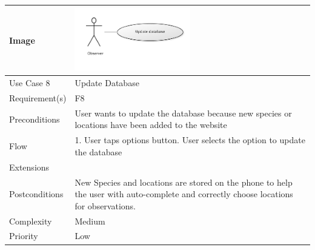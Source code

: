 \hspace{2em}


\begin{tabular}[t]{|l|p{}|}\hline
	Image&\includegraphics[width=0.5\textwidth]{reqspec/uc/updatedb.png} \\\hline
	Use Case 8&Update Database\\\hline
	Requirement(s)&F8\\\hline
	Preconditions&User wants to update the database because new species or
	locations have been added to the website\\\hline
	Flow&1. User taps options button\newline
	2. User selects the option to update the database\\\hline
	Extensions& \\\hline
	Postconditions&New Species and locations are stored on the phone to help
	the user with auto-complete and correctly choose locations for observations.\\\hline
	Complexity&Medium\\\hline
	Priority&Low\\\hline
\end{tabular}
